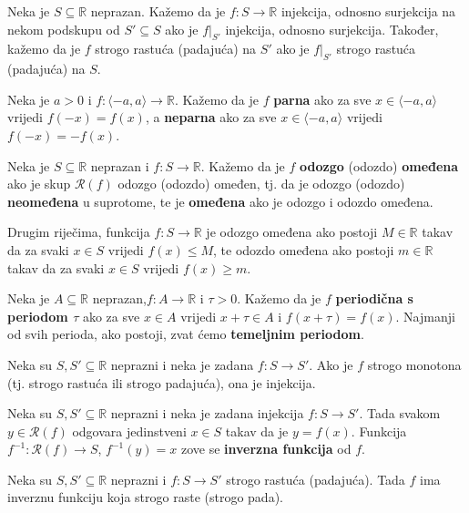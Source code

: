 \begin{remark}
Neka je \(S\subseteq \mathbb{R}\) neprazan. Kažemo da je \(f : S\to \mathbb{R}\) injekcija, odnosno surjekcija na nekom podskupu od \(S'\subseteq S\) ako je \(f|_{S'}\) injekcija, odnosno surjekcija. Također, kažemo da je \(f\) strogo rastuća (padajuća) na \(S'\) ako je \(f|_{S'}\) strogo rastuća (padajuća) na \(S\).
\end{remark}
\begin{definition}
Neka je $a>0$ i $f : \langle -a, a\rangle\to \mathbb{R}$. Kažemo da je $f$ \textbf{parna} ako za sve $x\in \langle -a, a\rangle$ vrijedi $f(-x)=f(x)$, a \textbf{neparna} ako za sve $x\in \langle -a, a\rangle$ vrijedi $f(-x)=-f(x)$.
\end{definition}
\begin{definition}
Neka je $S\subseteq \mathbb{R}$ neprazan i $f : S\to \mathbb{R}$. Kažemo da je $f$ \textbf{odozgo} (odozdo) \textbf{omeđena} ako je skup $\mathcal{R}(f)$ odozgo (odozdo) omeđen, tj. da je odozgo (odozdo) \textbf{neomeđena} u suprotome, te je \textbf{omeđena} ako je odozgo i odozdo omeđena.
\end{definition}
Drugim riječima, funkcija $f : S\to \mathbb{R}$ je odozgo omeđena ako postoji $M\in \mathbb{R}$ takav da za svaki $x\in S$ vrijedi $f(x)\leq M$, te odozdo omeđena ako postoji $m\in \mathbb{R}$ takav da za svaki $x\in S$ vrijedi $f(x)\geq m$.
\begin{definition}
\label{perioddef}
Neka je $A\subseteq \mathbb{R}$ neprazan,\(f : A\to \mathbb{R}\) i \(\tau>0\). Kažemo da je \(f\) \textbf{periodična s periodom \(\tau\)} ako za sve \(x\in A\) vrijedi \(x+\tau \in A\) i \(f(x+\tau)=f(x)\). Najmanji od svih perioda, ako postoji, zvat ćemo \textbf{temeljnim periodom}.
\end{definition}
\begin{remark}
Neka su \(S, S'\subseteq \mathbb{R}\) neprazni i neka je zadana \(f : S\to S'\). Ako je \(f\) strogo monotona (tj. strogo rastuća ili strogo padajuća), ona je injekcija.
\end{remark}
\begin{definition}
Neka su \(S, S'\subseteq \mathbb{R}\) neprazni i neka je zadana injekcija \(f : S\to S'\). Tada svakom \(y\in \mathcal{R}(f)\) odgovara jedinstveni \(x\in S\) takav da je \(y=f(x)\). Funkcija \(f^{-1} : \mathcal{R}(f)\to S\), \(f^{-1}(y)=x\) zove se \textbf{inverzna funkcija} od \(f\).
\end{definition}
\begin{remark}
\label{invmon}
Neka su \(S, S'\subseteq \mathbb{R}\) neprazni i \(f : S\to S'\) strogo rastuća (padajuća). Tada \(f\) ima inverznu funkciju koja strogo raste (strogo pada).
\end{remark}

